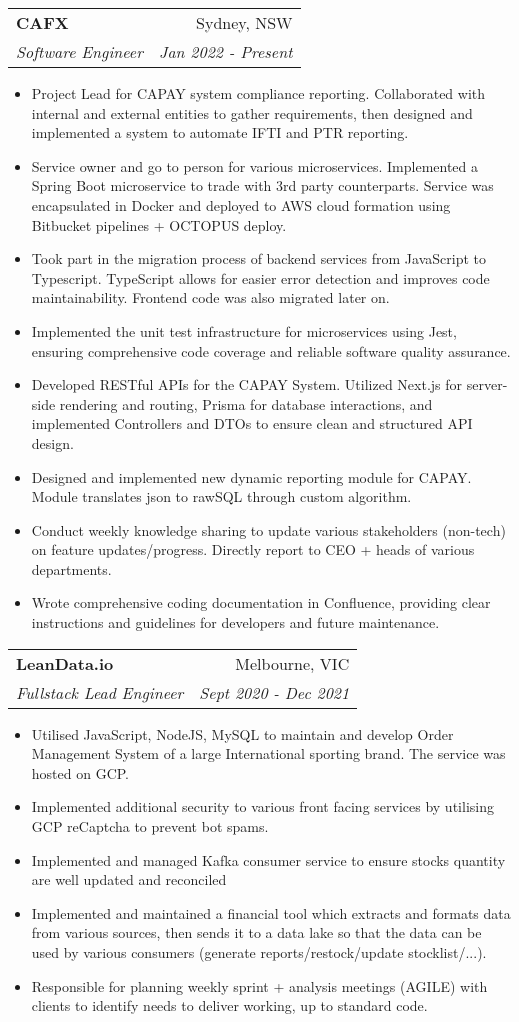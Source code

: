 \documentclass[letterpaper,11pt]{article}
\makeatletter
\newcommand{\resumeSubheading}[4]{
  \vspace{-1pt}\item
    \begin{tabular*}{0.97\textwidth}{l@{\extracolsep{\fill}}r}
      \textbf{#1} & #2 \\
      \textit{\small#3} & \textit{\small #4} \\
    \end{tabular*}\vspace{-5pt}
}
\newcommand{\resumeSingleItem}[1]{\item\small{{#1}\vspace{-2pt}}}
\newcommand{\resumeItemListStart}{\begin{itemize}[label={\textcolor{black}{$\bullet$}}]}
\newcommand{\resumeItemListEnd}{\end{itemize}\vspace{-5pt}}
\makeatother
\begin{document}
\resumeSubheading
{CAFX}{Sydney, NSW}
{Software Engineer}{Jan 2022 - Present}
\resumeItemListStart
\resumeSingleItem{Project Lead for CAPAY system compliance reporting. Collaborated with internal and external entities to gather requirements, then designed and implemented a system to automate IFTI and PTR reporting.}
\resumeSingleItem{Service owner and go to person for various microservices. Implemented a Spring Boot microservice to trade with 3rd party counterparts. Service was encapsulated in Docker and deployed to AWS cloud formation using Bitbucket pipelines + OCTOPUS deploy.}
\resumeSingleItem{Took part in the migration process of backend services from JavaScript to Typescript. TypeScript allows for easier error detection and improves code maintainability. Frontend code was also migrated later on.}
\resumeSingleItem{Implemented the unit test infrastructure for microservices using Jest, ensuring comprehensive code coverage and reliable software quality assurance.}
\resumeSingleItem{Developed RESTful APIs for the CAPAY System. Utilized Next.js for server-side rendering and routing, Prisma for database interactions, and implemented Controllers and DTOs to ensure clean and structured API design.}
\resumeSingleItem{Designed and implemented new dynamic reporting module for CAPAY. Module translates json to rawSQL through custom algorithm.}
\resumeSingleItem{Conduct weekly knowledge sharing to update various stakeholders (non-tech) on feature updates/progress. Directly report to CEO + heads of various departments.}
\resumeSingleItem{Wrote comprehensive coding documentation in Confluence, providing clear instructions and guidelines for developers and future maintenance.}
\resumeItemListEnd

\resumeSubheading
{LeanData.io}{Melbourne, VIC}
{Fullstack Lead Engineer}{Sept 2020 - Dec 2021}
\resumeItemListStart
\resumeSingleItem{Utilised JavaScript, NodeJS, MySQL to maintain and develop Order Management System of a large International sporting brand. The service was hosted on GCP.}
\resumeSingleItem{Implemented additional security to various front facing services by utilising GCP reCaptcha to prevent bot spams.}
\resumeSingleItem{Implemented and managed Kafka consumer service to ensure stocks quantity are well updated and reconciled}
\resumeSingleItem{Implemented and maintained a financial tool which extracts and formats data from various sources, then sends it to a data lake so that the data can be used by various consumers (generate reports/restock/update stocklist/...).}
\resumeSingleItem{Responsible for planning weekly sprint + analysis meetings (AGILE) with clients to identify needs to deliver working, up to standard code.}
\resumeItemListEnd
\end{document}
